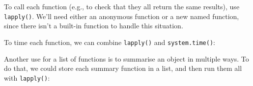 To call each function (e.g., to check that they all return the same
results), use \texttt{lapply()}. We'll need either an anonymous function
or a new named function, since there isn't a built-in function to handle
this situation.

\begin{Shaded}
\begin{Highlighting}[]
\CommentTok{#> }
\CommentTok{#> }

\StringTok{ }
\CommentTok{#> }
\CommentTok{#> }
\end{Highlighting}
\end{Shaded}

To time each function, we can combine \texttt{lapply()} and
\texttt{system.time()}:

\begin{Shaded}
\begin{Highlighting}[]
\NormalTok{(}
\CommentTok{#> }
\CommentTok{#> }
\end{Highlighting}
\end{Shaded}

Another use for a list of functions is to summarise an object in
multiple ways. To do that, we could store each summary function in a
list, and then run them all with \texttt{lapply()}:

\begin{Shaded}
\begin{Highlighting}[]
\StringTok{ }\NormalTok{:}
\StringTok{ }\NormalTok{(}
   
   
   
\NormalTok{)}
\CommentTok{#> }
\CommentTok{#> }
\end{Highlighting}
\end{Shaded}

